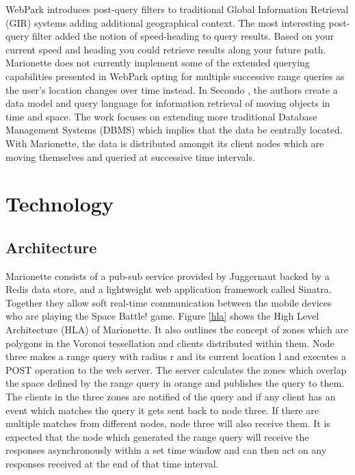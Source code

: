 \documentclass[12pt]{report}	%
\theoremstyle{definition}
\theoremstyle{remark}
\begin{document}
WebPark \cite{mountain2007geo} introduces post-query
filters to traditional Global Information Retrieval (GIR) systems adding
additional geographical context. The most interesting post-query filter
added the notion of speed-heading to query results. Based on your
current speed and heading you could retrieve results along your future
path. Marionette does not currently implement some of the extended
querying capabilities presented in WebPark opting for multiple
successive range queries as the user's location changes over time
instead. In Secondo \cite{teixeira2006querying}, the
authors create a data model and query language for information retrieval
of moving objects in time and space. The work focuses on extending more
traditional Database Management Systems (DBMS) which implies that the
data be centrally located. With Marionette, the data is distributed
amongst its client nodes which are moving themselves and queried at
successive time intervals.

\chapter{Technology}

\section{Architecture}

Marionette consists of a pub-sub service provided by Juggernaut backed
by a Redis data store, and a lightweight web application framework
called Sinatra. Together they allow soft real-time communication between
the mobile devices who are playing the Space Battle! game. Figure
\ref{hla} shows the High Level Architecture (HLA) of
Marionette. It also outlines the concept of zones which are polygons in
the Voronoi tessellation and clients distributed within them. Node three
makes a range query with radius r and its current location l and
executes a POST operation to the web server. The server calculates the
zones which overlap the space defined by the range query in orange and
publishes the query to them. The clients in the three zones are notified
of the query and if any client has an event which matches the query it
gets sent back to node three. If there are multiple matches from
different nodes, node three will also receive them. It is expected that
the node which generated the range query will receive the responses
asynchronously within a set time window and can then act on any
responses received at the end of that time interval.
\end{document}
